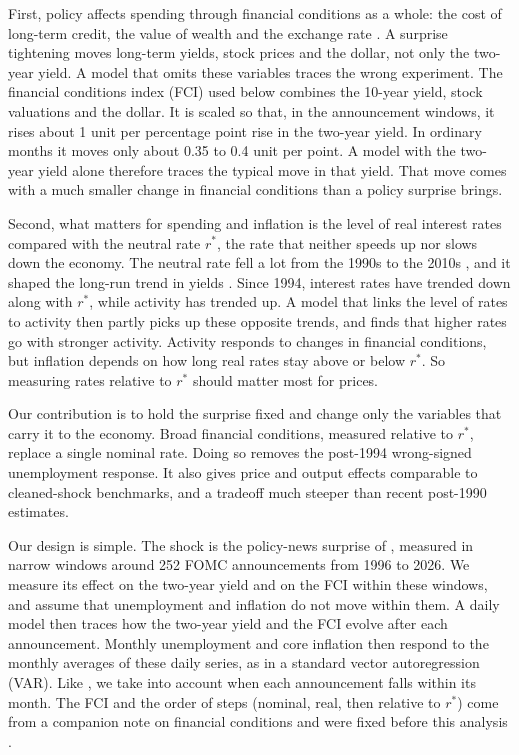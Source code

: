 \documentclass[11pt]{article}
\newcommand{\rs}{r^{*}}
\begin{document}
First, policy affects spending through financial conditions as a whole: the cost of long-term credit, the value of wealth and the exchange rate \citep{boivin2010}. A surprise tightening moves long-term yields, stock prices and the dollar, not only the two-year yield. A model that omits these variables traces the wrong experiment. The financial conditions index (FCI) used below combines the 10-year yield, stock valuations and the dollar. It is scaled so that, in the announcement windows, it rises about 1 unit per percentage point rise in the two-year yield. In ordinary months it moves only about 0.35 to 0.4 unit per point. A model with the two-year yield alone therefore traces the typical move in that yield. That move comes with a much smaller change in financial conditions than a policy surprise brings.

Second, what matters for spending and inflation is the level of real interest rates compared with the neutral rate $\rs$, the rate that neither speeds up nor slows down the economy. The neutral rate fell a lot from the 1990s to the 2010s \citep{laubach2003,holston2017,holston2023,hamilton2016,kiley2020}, and it shaped the long-run trend in yields \citep{bauer2020}. Since 1994, interest rates have trended down along with $\rs$, while activity has trended up. A model that links the level of rates to activity then partly picks up these opposite trends, and finds that higher rates go with stronger activity. Activity responds to changes in financial conditions, but inflation depends on how long real rates stay above or below $\rs$. So measuring rates relative to $\rs$ should matter most for prices.

Our contribution is to hold the surprise fixed and change only the variables that carry it to the economy. Broad financial conditions, measured relative to $\rs$, replace a single nominal rate. Doing so removes the post-1994 wrong-signed unemployment response. It also gives price and output effects comparable to cleaned-shock benchmarks, and a tradeoff much steeper than recent post-1990 estimates.

Our design is simple. The shock is the policy-news surprise of \citet{nakamura2018}, measured in narrow windows around 252 FOMC announcements from 1996 to 2026. We measure its effect on the two-year yield and on the FCI within these windows, and assume that unemployment and inflation do not move within them. A daily model then traces how the two-year yield and the FCI evolve after each announcement. Monthly unemployment and core inflation then respond to the monthly averages of these daily series, as in a standard vector autoregression (VAR). Like \citet{jacobson2026}, we take into account when each announcement falls within its month. The FCI and the order of steps (nominal, real, then relative to $\rs$) come from a companion note on financial conditions and were fixed before this analysis \citep{fcinote}.
\end{document}
